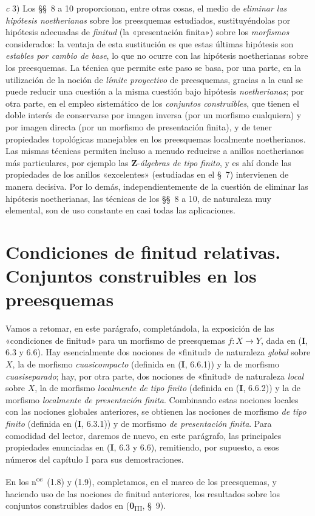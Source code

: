 \medskip
\noindent
\emph{c} 3) Los §§~8 a 10 proporcionan, entre otras cosas, el medio de \emph{eliminar las
hipótesis noetherianas} sobre los preesquemas estudiados, sustituyéndolas por
hipótesis adecuadas de \emph{finitud} (la «presentación finita») sobre los
\emph{morfismos} considerados: la ventaja de esta sustitución es que estas
últimas hipótesis son \emph{estables por cambio de base}, lo que no
ocurre con las hipótesis noetherianas sobre los preesquemas. La técnica
que permite este paso se basa, por una parte, en la utilización de la noción de
\emph{límite proyectivo} de preesquemas, gracias a la cual se puede reducir una
cuestión a la misma cuestión bajo hipótesis \emph{noetherianas}; por otra
parte, en el empleo sistemático de los \emph{conjuntos construibles}, que tienen
el doble interés de conservarse por imagen inversa (por un morfismo
cualquiera) y por imagen directa (por un morfismo de presentación finita), y
de tener propiedades topológicas manejables en los preesquemas localmente
noetherianos. Las mismas técnicas permiten incluso a menudo reducirse a
anillos noetherianos más particulares, por ejemplo las
$\mathbf Z$-\emph{álgebras de tipo finito}, y es ahí donde las propiedades de los
anillos «excelentes» (estudiadas en el §~7) intervienen de manera decisiva.
Por lo demás, independientemente de la cuestión de eliminar las hipótesis
noetherianas, las técnicas de los §§~8 a 10, de naturaleza muy elemental, son
de uso constante en casi todas las aplicaciones.

\setcounter{section}{0}

\section{Condiciones de finitud relativas. Conjuntos construibles en los preesquemas}
\label{section:IV.1-fr}

Vamos a retomar, en este parágrafo, completándola, la exposición de las
«condiciones de finitud» para un morfismo de preesquemas $f:X\to Y$, dada
en (\textbf{I}, 6.3 y 6.6). Hay esencialmente dos nociones de «finitud» de
naturaleza \emph{global} sobre $X$, la de morfismo \emph{cuasicompacto}
(definida en (\textbf{I}, 6.6.1)) y la de morfismo \emph{cuasiseparado}; hay,
por otra parte, dos nociones de «finitud» de naturaleza \emph{local} sobre $X$,
la de morfismo \emph{localmente de tipo finito} (definida en (\textbf{I}, 6.6.2))
y la de morfismo \emph{localmente de presentación finita}. Combinando
estas nociones locales con las nociones globales anteriores, se obtienen las nociones
de morfismo \emph{de tipo finito} (definida en (\textbf{I}, 6.3.1)) y de morfismo
\emph{de presentación finita}. Para comodidad del lector, daremos de
nuevo, en este parágrafo, las principales propiedades enunciadas en (\textbf{I}, 6.3
y 6.6), remitiendo, por supuesto, a esos números del capítulo I para sus
demostraciones.

En los n\textsuperscript{os}~(1.8) y (1.9), completamos, en el marco de los
preesquemas, y haciendo uso de las nociones de finitud anteriores, los
resultados sobre los conjuntos construibles dados en
(\textbf{0}\textsubscript{III}, §~9).

